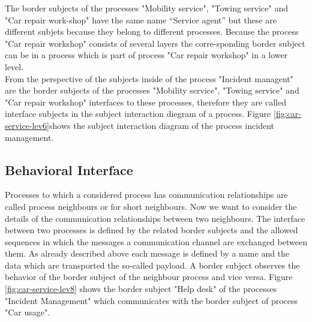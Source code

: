 The border subjects of the processes "Mobility service", "Towing service" and "Car repair work-shop" have the same name “Service agent” but these are different subjets because they belong to different processes. Because the process "Car repair workshop" consists of several layers the corre-sponding border subject can be in a process which is part of process "Car repair workshop" in a lower level.\\
From the perspective of the subjects inside of the process "Incident managent" are the border subjects of the processes "Mobility service", "Towing service" and "Car repair workshop" interfaces to these processes, therefore they are called interface subjects in the subject interaction diegram of a process. Figure \ref{fig:car-service-lev6}shows the subject interaction diagram of the process incident management.\\


\subsection{Behavioral Interface}
Processes to which a considered process has communication relationships are called process neighbours or for short neighbours. Now we want to consider the details of the communication relationships between two neighbours. The interface between two processes is defined by the related border subjects and the allowed sequences in which the messages a communication channel are exchanged between them. As already described above each message is defined by a name and the data which are transported the so-called payload. A border subject observes the behavior of the border subject of the neighbour process and vice versa. Figure \ref{fig:car-service-lev8} shows the border subject "Help desk" of the processes "Incident Management" which communicates with the border subject of process "Car usage".\\

